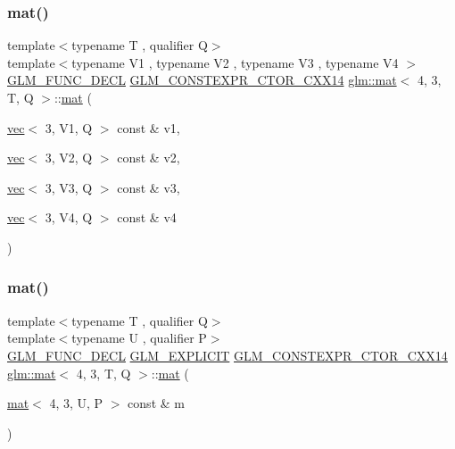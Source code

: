 \subsubsection{\texorpdfstring{mat()}{mat()}\hspace{0.1cm}{\footnotesize\ttfamily [8/21]}}
{\footnotesize\ttfamily template$<$typename T , qualifier Q$>$ \\
template$<$typename V1 , typename V2 , typename V3 , typename V4 $>$ \\
\mbox{\hyperlink{setup_8hpp_ab2d052de21a70539923e9bcbf6e83a51}{G\+L\+M\+\_\+\+F\+U\+N\+C\+\_\+\+D\+E\+CL}} \mbox{\hyperlink{setup_8hpp_a0900f9145e68bf6061b6f5e7be3fa751}{G\+L\+M\+\_\+\+C\+O\+N\+S\+T\+E\+X\+P\+R\+\_\+\+C\+T\+O\+R\+\_\+\+C\+X\+X14}} \mbox{\hyperlink{structglm_1_1mat}{glm\+::mat}}$<$ 4, 3, T, Q $>$\+::\mbox{\hyperlink{structglm_1_1mat}{mat}} (\begin{DoxyParamCaption}\item[{\mbox{\hyperlink{structglm_1_1vec}{vec}}$<$ 3, V1, Q $>$ const \&}]{v1,  }\item[{\mbox{\hyperlink{structglm_1_1vec}{vec}}$<$ 3, V2, Q $>$ const \&}]{v2,  }\item[{\mbox{\hyperlink{structglm_1_1vec}{vec}}$<$ 3, V3, Q $>$ const \&}]{v3,  }\item[{\mbox{\hyperlink{structglm_1_1vec}{vec}}$<$ 3, V4, Q $>$ const \&}]{v4 }\end{DoxyParamCaption})}

\mbox{\label{structglm_1_1mat_3_014_00_013_00_01_t_00_01_q_01_4_a3531198bc8455e7bcac09cbe197c59fd}} 
\subsubsection{\texorpdfstring{mat()}{mat()}\hspace{0.1cm}{\footnotesize\ttfamily [9/21]}}
{\footnotesize\ttfamily template$<$typename T , qualifier Q$>$ \\
template$<$typename U , qualifier P$>$ \\
\mbox{\hyperlink{setup_8hpp_ab2d052de21a70539923e9bcbf6e83a51}{G\+L\+M\+\_\+\+F\+U\+N\+C\+\_\+\+D\+E\+CL}} \mbox{\hyperlink{setup_8hpp_a6c74f5a5e7b134ab69023ff9a30d4d5d}{G\+L\+M\+\_\+\+E\+X\+P\+L\+I\+C\+IT}} \mbox{\hyperlink{setup_8hpp_a0900f9145e68bf6061b6f5e7be3fa751}{G\+L\+M\+\_\+\+C\+O\+N\+S\+T\+E\+X\+P\+R\+\_\+\+C\+T\+O\+R\+\_\+\+C\+X\+X14}} \mbox{\hyperlink{structglm_1_1mat}{glm\+::mat}}$<$ 4, 3, T, Q $>$\+::\mbox{\hyperlink{structglm_1_1mat}{mat}} (\begin{DoxyParamCaption}\item[{\mbox{\hyperlink{structglm_1_1mat}{mat}}$<$ 4, 3, U, P $>$ const \&}]{m }\end{DoxyParamCaption})}

